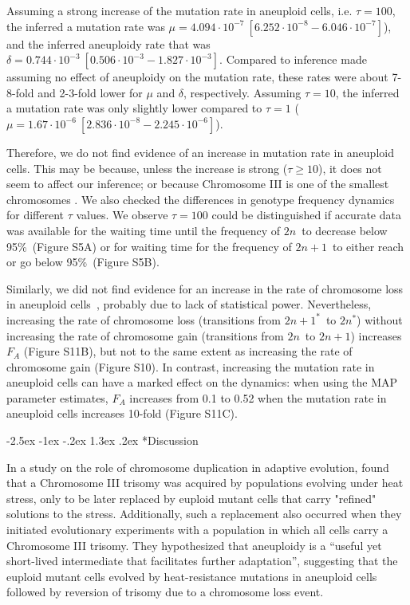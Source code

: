 \documentclass[12pt]{article}
\makeatletter
\renewcommand\section{\@startsection {section}{1}{\z@}%
     {-2.5ex \@plus -1ex \@minus -.2ex}%
     {1.3ex \@plus.2ex}%
    {\Large\bfseries}}
\newcommand{\euwt}{\emph{$2n$}}
\newcommand{\anwt}{\emph{$2n+1$}}
\newcommand{\eumt}{\emph{$2n^*$}}
\newcommand{\anmt}{\emph{$2n+1^*$}}
\makeatother
\begin{document}
Assuming a strong increase of the mutation rate in aneuploid cells, i.e. $\tau=100$, the inferred a mutation rate was $\mu=4.094\cdot10^{-7}\ [6.252\cdot10^{-8}-6.046\cdot10^{-7}]$), and the inferred aneuploidy rate that was  $\delta=0.744\cdot10^{-3}\ [0.506\cdot10^{-3}-1.827\cdot10^{-3}]$. 
Compared to inference made assuming no effect of aneuploidy on the mutation rate, these rates were about 7-8-fold and 2-3-fold lower for $\mu$ and $\delta$, respectively.
Assuming $\tau=10$, the inferred a mutation rate was only slightly lower compared to $\tau=1$ ($\mu=1.67\cdot10^{-6}\ [2.836\cdot10^{-8}-2.245\cdot10^{-6}]$). 

Therefore, we do not find evidence of an increase in mutation rate in aneuploid cells. This may be because, unless the increase is strong ($\tau \ge 10$), it does not seem to affect our inference; or because Chromosome III is one of the smallest chromosomes \citep{Gilchrist2019}.
We also checked the differences in genotype frequency dynamics for different $\tau$ values. We observe $\tau=100$ could be distinguished if accurate data was available for the waiting time until the frequency of \euwt\ to decrease below 95\%~(Figure S5A) or for waiting time for the frequency of \anwt\ to either reach or go below 95\%~(Figure S5B).

Similarly, we did not find evidence for an increase in the rate of chromosome loss in aneuploid cells~\citep{Sheltzer2011b}, probably due to lack of statistical power.
Nevertheless, increasing the rate of chromosome loss (transitions from \anmt\ to \eumt) without increasing the rate of chromosome gain (transitions from \euwt\ to \anwt) increases $F_A$ (Figure S11B), but not to the same extent as increasing the rate of chromosome gain (Figure S10).
In contrast, increasing the mutation rate in aneuploid cells can have a marked effect on the dynamics: when using the MAP parameter estimates, $F_A$ increases from  0.1 to 0.52 when the mutation rate in aneuploid cells increases 10-fold (Figure S11C).


\section*{Discussion}

In a study on the role of chromosome duplication in adaptive evolution, 
\citet{Yona2012} found that a Chromosome III trisomy was acquired by \yeast populations evolving under heat stress, only to be later replaced by euploid mutant cells that carry "refined" solutions to the stress. 
Additionally, such a replacement also occurred when they initiated evolutionary experiments with a population in which all cells carry a Chromosome III trisomy.
They hypothesized that aneuploidy is a ``useful yet short-lived intermediate that facilitates further adaptation'', suggesting that the euploid mutant cells evolved by heat-resistance mutations in aneuploid cells followed by reversion of trisomy due to a chromosome loss event. 
\end{document}
